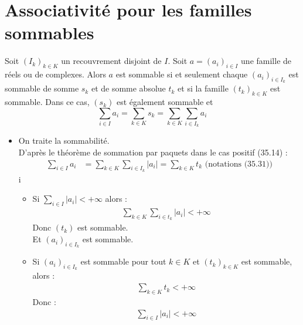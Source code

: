 \documentclass[../main.tex]{subfiles}
\begin{document}
\section{Associativité pour les familles sommables}
\begin{tcolorbox}[title=Théorème 35.31, title filled=false, colframe=orange, colback=orange!10!white]
    Soit $\left(I_k\right)_{k \in K}$ un recouvrement disjoint de $I$. Soit $a=\left(a_i\right)_{i \in I}$ une famille de réels ou de complexes. Alors $a$ est sommable si et seulement chaque $\left(a_i\right)_{i \in I_k}$ est sommable de somme $s_k$ et de somme absolue $t_k$ et si la famille $\left(t_k\right)_{k \in K}$ est sommable. Dans ce cas, $\left(s_k\right)$ est également sommable et
    $$\sum_{i \in I} a_i=\sum_{k \in K} s_k=\sum_{k \in K} \sum_{i \in I_k} a_i$$
\end{tcolorbox}

\begin{itemize}
    \item On traite la sommabilité. \\
    D'après le théorème de sommation par paquets dans le cas positif (35.14) : 
    \begin{align*}
        \sum_{i\in I} a_i &= \sum_{k\in K} \sum_{i\in I_k} |a_i| = \sum_{k\in K} t_k \text{ (notations (35.31))}
    \end{align*}i
    \begin{itemize}
        \item Si $\sum_{i\in I} |a_i| < +\infty$ alors : 
        \begin{align*}
            \sum_{k\in K}\sum_{i\in t_k} |a_i| < +\infty
        \end{align*}
        Donc $(t_k)$ est sommable. \\
        Et $(a_i)_{i\in I_k}$ est sommable. 
        \item Si $(a_i)_{i\in I_k}$ est sommable pour tout $k\in K$ et $(t_k)_{k\in K}$ est sommable, alors :
        \begin{align*}
            \sum_{k\in K} t_k < +\infty
        \end{align*}
        Donc : 
        \begin{align*}
            \sum_{i\in I} |a_i| < +\infty
        \end{align*}
    \end{itemize}
\end{itemize}
\end{document}
